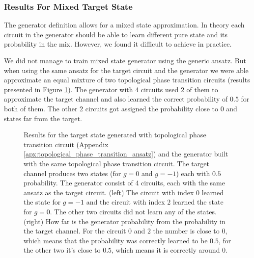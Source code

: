 \subsubsection{Results For Mixed Target State}
The generator definition allows for a mixed state approximation. In theory each
circuit in the generator should be able to learn different pure state and its
probability in the mix. However, we found it difficult to achieve in practice.

We did not manage to train mixed state generator using the generic ansatz. But
when using the same ansatz for the target circuit and the generator we were able
approximate an equal mixture of two topological phase transition circuits (results
presented in Figure \ref{fig:wqgans_grid_phase_1}). The generator with 4 circuits
used 2 of them to approximate the target channel and also learned the correct
probability of $0.5$ for both of them. The other 2 circuits got assigned the
probability close to $0$ and states far from the target.

\begin{figure}[htbp!]
  \captionsetup[subfigure]{labelformat=empty}
  \centering
  \caption{Results for the target state generated with topological phase transition circuit (Appendix
    \ref{apx:topological_phase_transition_ansatz}) and the generator built with 
    the same topological phase transition circuit. The target channel
    produces two states (for $g=0$ and $g=-1$) each with $0.5$ probability.
    The generator consist of 4 circuits, each with the same ansatz as the target
    circuit. (left) The circuit with index $0$ learned the state for $g=-1$ and the
    circuit with index $2$ learned the state for $g=0$. The other two circuits
    did not learn any of the states. (right) How far is the generator probability 
    from the probability in the target channel. For the circuit $0$
    and $2$ the number is close to $0$, which means that the probability was
    correctly learned to be $0.5$, for the other two it's close to $0.5$, which
    means it is correctly around $0$.
  }
  \label{fig:wqgans_grid_phase_1}
\end{figure}


